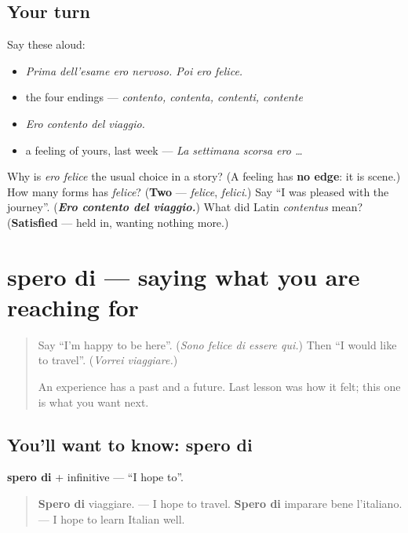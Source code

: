 \subsection*{Your turn}
Say these aloud:

\begin{itemize}
\raggedright
  \item \emph{Prima dell'esame ero nervoso. Poi ero felice.}
  \item the four endings — \emph{contento, contenta, contenti, contente}
  \item \emph{Ero contento del viaggio.}
  \item a feeling of yours, last week — \emph{La settimana scorsa ero …}
\end{itemize}

\begin{tcolorbox}[breakable,colback=teal!4,colframe=teal!35!black,title={Before you move on}]
Why is \emph{ero felice} the usual choice in a story? (A feeling has \textbf{no edge}: it is scene.) How many forms has \emph{felice}? (\textbf{Two} — \emph{felice}, \emph{felici}.) Say \textquotedblleft{}I was pleased with the journey\textquotedblright{}. (\emph{\textbf{Ero contento del viaggio.}}) What did Latin \emph{contentus} mean? (\textbf{Satisfied} — held in, wanting nothing more.)
\end{tcolorbox}
\section[spero di]{spero di — saying what you are reaching for}

\label{lesson:IT-C269-spero-di}



\begin{quote}
Say \textquotedblleft{}I'm happy to be here\textquotedblright{}. (\emph{Sono felice di essere qui.}) Then \textquotedblleft{}I would like to travel\textquotedblright{}. (\emph{Vorrei viaggiare.})

An experience has a past and a future. Last lesson was how it felt; this one is what you want next.
\end{quote}

\subsection*{You'll want to know: spero di}
\textbf{spero di} + infinitive — \textquotedblleft{}I hope to\textquotedblright{}.

\begin{quote}
\textbf{Spero di} viaggiare. — I hope to travel. \textbf{Spero di} imparare bene l'italiano. — I hope to learn Italian well.
\end{quote}

